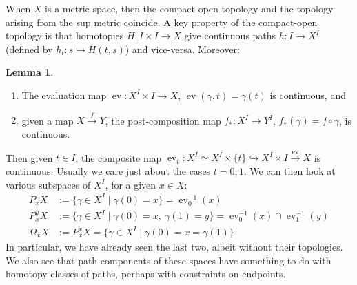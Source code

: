 \documentclass{tufte-handout}
\def\into {\hookrightarrow}
\DeclareMathOperator{\ev}{ev}
\theoremstyle{definition}
\newtheorem{lemma}{Lemma}
\begin{document}
When $X$ is a metric space, then the compact-open topology and the topology arising from the 
sup metric coincide. A key property of the compact-open topology is that homotopies $H\colon 
I\times I \to X$ give continuous paths $h\colon I \to X^I$ (defined by $h_t\colon s\mapsto H(t,s)$) and vice-versa. Moreover:

\begin{lemma}

\begin{enumerate}
\item The evaluation map $\ev\colon X^I \times I\to X$, $\ev(\gamma,t) = \gamma(t)$ is continuous, and 
\item given a map $X\xrightarrow{f} Y$, the post-composition map $f_*\colon X^I \to Y^I$, $f_*(\gamma) = f\circ \gamma$, is continuous.
\end{enumerate}
\end{lemma}

Then given $t\in I$, the composite map $\ev_t\colon X^I \simeq X^I\times\{t\} \into X^I \times I \xrightarrow{\ev} X$ is continuous.
Usually we care just about the cases $t=0,1$. 
We can then look at various subspaces of $X^I$, for a given $x\in X$:
\begin{align*}
P_xX & := \{\gamma \in X^I\mid \gamma(0)=x\} = \ev_0^{-1}(x)\\
P_x^yX & := \{\gamma \in X^I\mid \gamma(0)=x,\ \gamma(1)=y\} = \ev_0^{-1}(x)\cap \ev_1^{-1}(y)\\
\Omega_x X & := P_x^x X = \{\gamma \in X^I \mid \gamma(0) = x = \gamma(1)\}
\end{align*}
In particular, we have already seen the last two, albeit without their topologies. We also see that path 
components of these spaces have something to do with homotopy classes of paths, perhaps with
constraints on endpoints.
\end{document}
